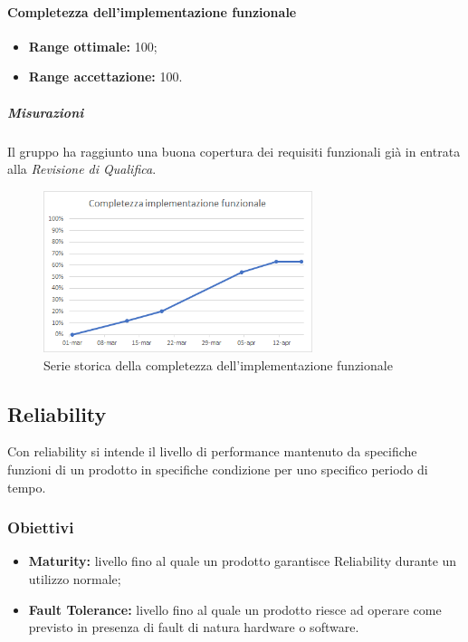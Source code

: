 			\paragraph{Completezza dell'implementazione funzionale}\Spazio
			\begin{itemize}
				\item {\textbf{Range ottimale:} 100;}
				\item {\textbf{Range accettazione:} 100.}
			\end{itemize} 
            \subparagraph{Misurazioni}
            Il gruppo ha raggiunto una buona copertura dei requisiti funzionali già in entrata alla \emph{Revisione di Qualifica}.
            \begin{figure}[H]
            	\centering 
            	\includegraphics[width=0.7\textwidth]{Images/completezza-funzionale.png}
            	\caption{Serie storica della completezza dell'implementazione funzionale}
            	\label{cf} 
            \end{figure}
             
	\subsection{Reliability}
		Con reliability si intende il livello di performance mantenuto da specifiche funzioni di un prodotto in specifiche condizione per uno specifico periodo di tempo.
		\subsubsection{Obiettivi}
		\begin{itemize}
			\item {\textbf{Maturity:} livello fino al quale un prodotto garantisce Reliability durante un utilizzo normale;}
			\item {\textbf{Fault Tolerance:} livello fino al quale un prodotto riesce ad operare come previsto in presenza di fault di natura hardware o software.}
		\end{itemize}
